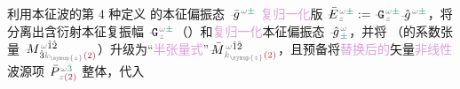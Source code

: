 利用\textcolor{PineGreen}{本征波}的第 4 种定义  的\textcolor{PineGreen}{本征偏振态} $\Xint{{}^{}_{\mathcolor{gray}{-}}}{10}{\bar{g}}^{\;\! \mathcolor{gray}{\omega} \textcolor{PineGreen}{\pm}}$ \textcolor{Plum}{复归一化}版 $\Xint{\mathcolor{gray}{-}}{25}{\bar{E}}^{\;\! \mathcolor{gray}{\omega} \textcolor{PineGreen}{\pm}}_{\;\! \mathcolor{gray}{z}} := \Xint{\mathcolor{gray}{-}}{16}{\mathtt{G}}^{\;\! \mathcolor{gray}{\omega} \textcolor{PineGreen}{\pm}}_{\;\! \mathcolor{gray}{z}} \Xint{{}^{}_{\mathcolor{gray}{-}}}{10}{\hat{g}}^{\;\! \mathcolor{gray}{\omega} \textcolor{PineGreen}{\pm} }$，将  分离出\textcolor{PineGreen}{含衍射本征复振幅} $\Xint{\mathcolor{gray}{-}}{16}{\mathtt{G}}^{\;\!\mathcolor{gray}{\omega} \textcolor{PineGreen}{\pm}}_{\;\! \mathcolor{gray}{z}}$（）和\textcolor{Plum}{复归一化}\textcolor{PineGreen}{本征偏振态} $\Xint{{}^{}_{\mathcolor{gray}{-}}}{10}{\hat{g}}^{\;\!\mathcolor{gray}{\omega}}_{\;\! \textcolor{PineGreen}{\pm}}$，并将 （的系数张量 $\Xint{\mathcolor{gray}{-}}{18}{M}^{\;\! \mathcolor{gray}{\omega} \hat{1} \hat{2} }_{\;\! \hat{3} \mathcolor{gray}{k_{\symup{z}}} \textcolor{Maroon}{(2)} }$）升级为“\textcolor{Plum}{半张量式}”$\Xint{\mathcolor{gray}{-}}{18}{\bar{M}}^{\;\! \mathcolor{gray}{\omega} \hat{1} \hat{2} }_{\;\! \mathcolor{gray}{k_{\symup{z}}} \textcolor{Maroon}{(2)} }$，且预备将\textcolor{Plum}{替换后的}矢量\textcolor{Plum}{非线性}\textcolor{NavyBlue}{波源}项 $\Xint{\mathcolor{gray}{-}}{30}{\bar{P}}^{\;\! \mathcolor{gray}{\omega} \textcolor{PineGreen}{\hat{3}} }_{\;\! \mathcolor{gray}{z} \textcolor{Maroon}{(2)} }$ 整体，代入 
